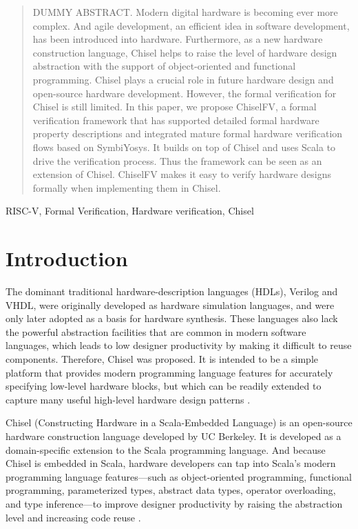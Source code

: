 \documentclass[conference]{IEEEtran}
\theoremstyle{definition}
\begin{document}
\begin{abstract}
    DUMMY ABSTRACT.
    Modern digital hardware is becoming ever more complex. And agile development, an efficient idea in software development, has been introduced into hardware. Furthermore, as a new hardware construction language, Chisel helps to raise the level of hardware design abstraction with the support of object-oriented and functional programming. Chisel plays a crucial role in future hardware design and open-source hardware development. However, the formal verification for Chisel is still limited. In this paper, we propose ChiselFV, a formal verification framework that has supported detailed formal hardware property descriptions and integrated mature formal hardware verification flows based on SymbiYosys. It builds on top of Chisel and uses Scala to drive the verification process. Thus the framework can be seen as an extension of Chisel. ChiselFV makes it easy to verify hardware designs formally when implementing them in Chisel.
\end{abstract}

\begin{IEEEkeywords}
RISC-V, Formal Verification, Hardware verification, Chisel
\end{IEEEkeywords}

\section{Introduction}
The dominant traditional hardware-description languages (HDLs), Verilog and VHDL, were originally developed as hardware simulation languages, and were only later adopted as a basis for hardware synthesis. 
These languages also lack the powerful abstraction facilities that are common in modern software languages, which leads to low designer productivity by making it difficult to reuse components.
Therefore, Chisel was proposed.
It is intended to be a simple platform that provides modern programming language features for accurately specifying low-level hardware blocks, but which can be readily extended to capture many useful high-level hardware design patterns \cite{bachrach2012chisel}.

Chisel (Constructing Hardware in a Scala-Embedded Language) is an open-source hardware construction language developed by UC Berkeley. It is developed as a domain-specific extension to the Scala programming language. And because Chisel is embedded in Scala, hardware developers can tap into Scala’s modern programming language features—such as object-oriented programming, functional programming, parameterized types, abstract data types, operator overloading, and type inference—to improve designer productivity by raising the abstraction level and increasing code reuse \cite{lee2016agile}.
\end{document}
